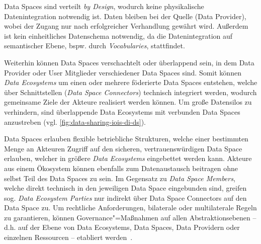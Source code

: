 Data Spaces sind verteilt \emph{by Design}, wodurch keine physikalische Datenintegration notwendig ist.
Daten bleiben bei der Quelle (Data Provider), wobei der Zugang nur nach erfolgreicher Verhandlung gewährt wird.
Außerdem ist kein einheitliches Datenschema notwendig, da die Datenintegration auf semantischer Ebene, bspw. durch \emph{Vocabularies}, stattfindet.

Weiterhin können Data Spaces verschachtelt oder überlappend sein, in dem Data Provider oder User Mitglieder verschiedener Data Spaces sind.
Somit können \emph{Data Ecosystems} um einen oder mehrere föderierte Data Spaces entstehen, welche über Schnittstellen (\emph{Data Space Connectors}) technisch integriert werden, wodurch gemeinsame Ziele der Akteure realisiert werden können.
Um große Datensilos zu verhindern, sind überlappende Data Ecosystems mit verbunden Data Spaces anzustreben (vgl. \autoref{fig:data-sharing-iois-di-ds}).

Data Spaces erlauben flexible betriebliche Strukturen, welche einer bestimmten Menge an Akteuren Zugriff auf den sicheren, vertrauenswürdigen Data Space erlauben, welcher in größere \emph{Data Ecosystems} eingebettet werden kann.
Akteure aus einem Ökosystem können ebenfalls zum Datenaustausch beitragen ohne selbst Teil des Data Spaces zu sein.
Im Gegensatz zu \emph{Data Space Members}, welche direkt technisch in den jeweiligen Data Space eingebunden sind, greifen sog. \emph{Data Ecosystem Parties} nur indirekt über Data Space Connectors auf den Data Space zu.
Um rechtliche Anforderungen, bilaterale oder multilaterale Regeln zu garantieren, können Governance"=Maßnahmen auf allen Abstraktionsebenen -- d.h. auf der Ebene von Data Ecosystems, Data Spaces, Data Providern oder einzelnen Ressourcen -- etabliert werden~\cite{mollerIndustrialDataEcosystems2024}.
